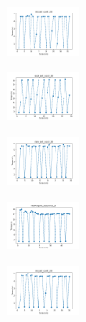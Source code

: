 \begin{figure}[H]    
    \centering
    \begin{subfigure}
        \centering
        \includegraphics[width=0.234\textwidth]{img/ils-es/iris_set_const_20_949004259_time.png}
    \end{subfigure}
    \hfill
    \begin{subfigure}
        \centering
        \includegraphics[width=0.234\textwidth]{img/ils-es/ecoli_set_const_20_949004259_time.png}
    \end{subfigure}
    \hfill
    \begin{subfigure}
        \centering
        \includegraphics[width=0.234\textwidth]{img/ils-es/rand_set_const_20_949004259_time.png}
    \end{subfigure}
    \hfill
    \begin{subfigure}
        \centering
        \includegraphics[width=0.234\textwidth]{img/ils-es/newthyroid_set_const_20_949004259_time.png}
    \end{subfigure}
    \hfill
    \begin{subfigure}
        \centering
        \includegraphics[width=0.234\textwidth]{img/ils-es/iris_set_const_20_589741062_time.png}
    \end{subfigure}

\end{figure}
